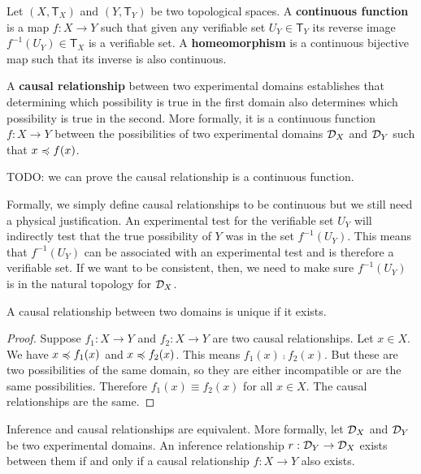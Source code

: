 \documentclass[11pt,letterpaper,fleqn]{memoir} %
\begin{document}
\begin{mathSection}
	\begin{defn}
		Let $(X, \mathsf{T}_X)$ and $(Y, \mathsf{T}_Y)$ be two topological spaces. A \textbf{continuous function} is a map $f: X \to Y$ such that given any verifiable set $U_Y \in \mathsf{T}_Y$ its reverse image $f^{-1}(U_Y) \in \mathsf{T}_X$ is a verifiable set. A \textbf{homeomorphism} is a continuous bijective map such that its inverse is also continuous.
	\end{defn}
	\begin{defn}
		A \textbf{causal relationship} between two experimental domains establishes that determining which possibility is true in the first domain also determines which possibility is true in the second. More formally, it is a continuous function $f : X \to Y$ between the possibilities of two experimental domains $\mathcal{D}_X$ and $\mathcal{D}_Y$ such that $x \preccurlyeq f(x)$.
	\end{defn}
TODO: we can prove the causal relationship is a continuous function.
	\begin{justification}
		Formally, we simply define causal relationships to be continuous but we still need a physical justification. An experimental test for the verifiable set $U_Y$ will indirectly test that the true possibility of $Y$ was in the set $f^{-1}(U_Y)$. This means that $f^{-1}(U_Y)$ can be associated with an experimental test and is therefore a verifiable set. If we want to be consistent, then, we need to make sure $f^{-1}(U_Y)$ is in the natural topology for $\mathcal{D}_X$.
	\end{justification}
	\begin{coro}
		A causal relationship between two domains is unique if it exists.
	\end{coro}\label{prop_causal_relationship_unique}
	\begin{proof}
		Suppose $f_1 : X \to Y$ and $f_2 : X \to Y$ are two causal relationships. Let $x \in X$. We have $x \preccurlyeq f_1(x)$ and $x \preccurlyeq f_2(x)$. This means $f_1(x) \comp f_2(x)$. But these are two possibilities of the same domain, so they are either incompatible or are the same possibilities. Therefore $f_1(x) \equiv f_2(x)$ for all $x \in X$. The causal relationships are the same.
	\end{proof}
	\begin{thrm}
		Inference and causal relationships are equivalent. More formally, let $\mathcal{D}_X$ and $\mathcal{D}_Y$ be two experimental domains. An inference relationship $r: \mathcal{D}_Y \to \mathcal{D}_X$ exists between them if and only if a causal relationship $f: X \to Y$ also exists.

\end{thrm}
\end{mathSection}
\end{document}
